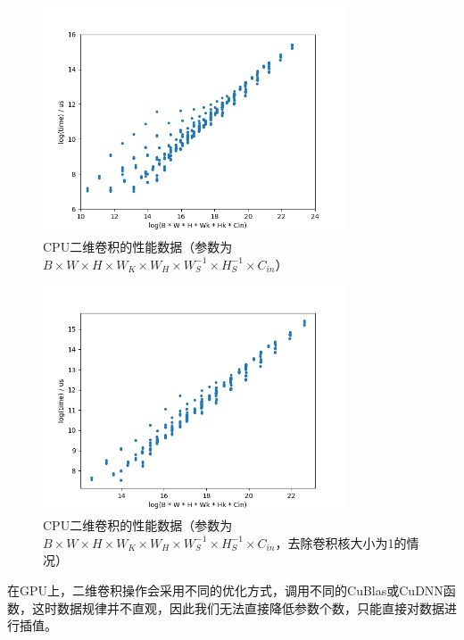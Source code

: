     \begin{figure}[!htbp]
        \centering
        \includegraphics[width=0.8\textwidth]{figures/conv_cpu_fix0.png}
        \caption{CPU二维卷积的性能数据（参数为$ B \times W \times H \times W_K \times W_H \times W_S^{-1} \times H_S^{-1} \times C_{in}  $）}
        \label{fig:conv_cpu_fix0}
    \end{figure}

    \begin{figure}[!htbp]
        \centering
        \includegraphics[width=0.8\textwidth]{figures/conv_cpu_fix1.png}
        \caption{CPU二维卷积的性能数据（参数为$ B \times W \times H \times W_K \times W_H \times W_S^{-1} \times H_S^{-1} \times C_{in}  $，去除卷积核大小为1的情况）}
        \label{fig:conv_cpu_fix1}
    \end{figure}

    在GPU上，二维卷积操作会采用不同的优化方式，调用不同的CuBlas或CuDNN函数，这时数据规律并不直观，因此我们无法直接降低参数个数，只能直接对数据进行插值。
    
